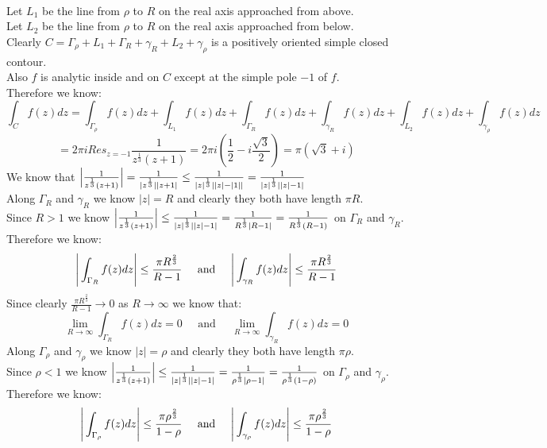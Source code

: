\documentclass{article}
\begin{document}
\begin{center}
    \\Let $L_1$ be the line from $\rho$ to $R$ on the real axis approached from above.
    \\Let $L_2$ be the line from $\rho$ to $R$ on the real axis approached from below.
    \\Clearly $C =\Gamma _{\rho} + L_1 +\Gamma _R +\gamma _R + L_2 +\gamma _{\rho}$ is a positively oriented simple closed contour.
    \\Also $f$ is analytic inside and on $C$ except at the simple pole $-1$ of $f$.
    \\Therefore we know:
    \[\int _C f(z) dz =\int _{\Gamma _{\rho}} f(z) dz +\int _{L_1} f(z) dz +\int _{\Gamma _R} f(z) dz +\int _{\gamma _R} f(z) dz +\int _{L_2} f(z) dz +\int _{\gamma _{\rho}} f(z) dz\]
    \[= 2\pi i Res_{z=-1}\frac{1}{z^{\frac{1}{3}}(z + 1)} =2\pi i(\frac{1}{2} - i\frac{\sqrt{3}}{2}) =\pi(\sqrt{3} + i)\]
    \newpage
    We know that $\Big{|}\frac{1}{z^{\frac{1}{3}}(z + 1)}\Big{|} =\frac{1}{|z^\frac{1}{3}||z + 1|}\leq\frac{1}{|z|^{\frac{1}{3}}||z| - |1||} =\frac{1}{|z|^{\frac{1}{3}}||z| - 1|}$
    \\Along $\Gamma _R$ and $\gamma _R$ we know $|z| = R$ and clearly they both have length $\pi R$.
    \\Since $R > 1$ we know $\Big{|}\frac{1}{z^{\frac{1}{3}}(z + 1)}\Big{|}\leq\frac{1}{|z|^{\frac{1}{3}}||z| - 1|} =\frac{1}{R^{\frac{1}{3}}|R - 1|} =\frac{1}{R^{\frac{1}{3}}(R - 1)}$ on $\Gamma _R$ and $\gamma _R$.
    \\Therefore we know:
    \[\Bigg{|}\int _{\Gamma _R} f(z) dz\Bigg{|}\leq\frac{\pi R^{\frac{2}{3}}}{R - 1}\;\;\;\;\;\text{and}\;\;\;\;\;\Bigg{|}\int _{\gamma _R} f(z) dz\Bigg{|}\leq\frac{\pi R^{\frac{2}{3}}}{R - 1}\]
    Since clearly $\frac{\pi R^{\frac{2}{3}}}{R - 1}\rightarrow 0$ as $R\rightarrow\infty$ we know that:
    \[\lim _{R\rightarrow\infty}\int _{\Gamma _R} f(z) dz = 0\;\;\;\;\;\text{and}\;\;\;\;\;\lim _{R\rightarrow\infty}\int _{\gamma _R} f(z) dz = 0\]
    Along $\Gamma _{\rho}$ and $\gamma _{\rho}$ we know $|z| =\rho$ and clearly they both have length $\pi\rho$.
    \\Since $\rho < 1$ we know $\Big{|}\frac{1}{z^{\frac{1}{3}}(z + 1)}\Big{|}\leq\frac{1}{|z|^{\frac{1}{3}}||z| - 1|} =\frac{1}{\rho ^{\frac{1}{3}}|\rho - 1|} =\frac{1}{\rho ^{\frac{1}{3}}(1 -\rho )}$ on $\Gamma _{\rho}$ and $\gamma _{\rho}$.
    \\Therefore we know:
    \[\Bigg{|}\int _{\Gamma _{\rho}} f(z) dz\Bigg{|}\leq\frac{\pi\rho ^{\frac{2}{3}}}{1 -\rho}\;\;\;\;\;\text{and}\;\;\;\;\;\Bigg{|}\int _{\gamma _{\rho}} f(z) dz\Bigg{|}\leq\frac{\pi\rho ^{\frac{2}{3}}}{1 -\rho}\]

\end{center}
\end{document}
